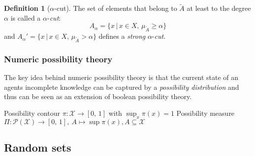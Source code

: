\documentclass[
]{report}
\theoremstyle{definition}
\theoremstyle{definition}
\newtheorem{definition}{Definition}[section]
\begin{document}
\begin{definition}[$\alpha$-cut]
The set of elements that belong to $\tilde{A}$ at least to the degree $\alpha$ is called a $\alpha$-\textit{cut}:
$$A_{\alpha} = \big\{ x \, | \, x \in X, \, \mu_{\tilde{A}} \geq \alpha \big\}$$
and $A_{\alpha}' = \big\{ x \, | \, x \in X, \, \mu_{\tilde{A}} > \alpha \big\}$ defines a \textit{strong} $\alpha$-\textit{cut}. 
\end{definition}

\subsubsection{Numeric possibility theory}

The key idea behind numeric possibility theory is that the current state
of an agents incomplete knowledge can be captured by a
\textit{possibility distribution} and thus can be seen as an extension
of boolean possibility theory.

Possibility contour \(\pi: \mathcal{X} \rightarrow [0, \, 1]\) with
\(\sup_x \pi (x) = 1\) Possibility measure
\(\Pi: \mathcal{P}(\mathcal{X}) \rightarrow [0, \, 1], \ A \mapsto \sup \pi (x), A \subseteq \mathcal{X}\)

\subsection{Random sets}
\end{document}
